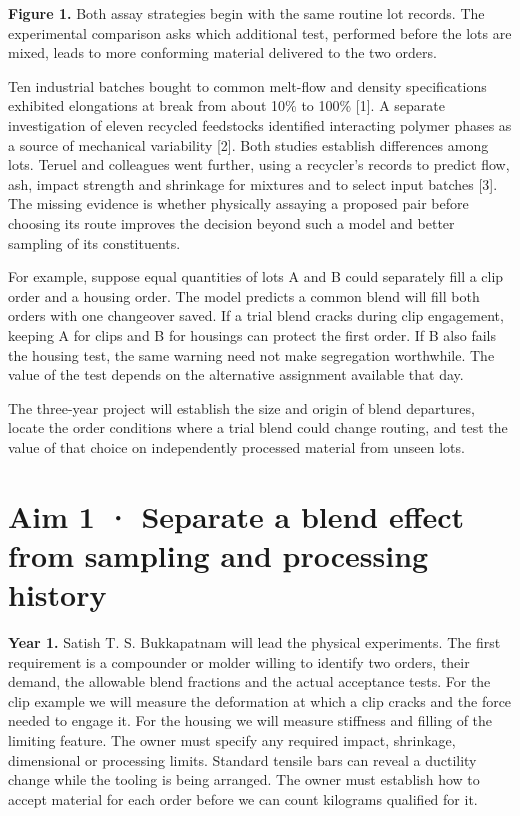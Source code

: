 \documentclass[11pt,letterpaper]{article}
\begin{document}
{\small\textbf{Figure 1.} Both assay strategies begin with the same routine lot records. The experimental comparison asks which additional test, performed before the lots are mixed, leads to more conforming material delivered to the two orders.}

Ten industrial batches bought to common melt-flow and density specifications exhibited elongations at break from about 10\% to 100\% [1]. A separate investigation of eleven recycled feedstocks identified interacting polymer phases as a source of mechanical variability [2]. Both studies establish differences among lots. Teruel and colleagues went further, using a recycler's records to predict flow, ash, impact strength and shrinkage for mixtures and to select input batches [3]. The missing evidence is whether physically assaying a proposed pair before choosing its route improves the decision beyond such a model and better sampling of its constituents.

For example, suppose equal quantities of lots A and B could separately fill a clip order and a housing order. The model predicts a common blend will fill both orders with one changeover saved. If a trial blend cracks during clip engagement, keeping A for clips and B for housings can protect the first order. If B also fails the housing test, the same warning need not make segregation worthwhile. The value of the test depends on the alternative assignment available that day.

The three-year project will establish the size and origin of blend departures, locate the order conditions where a trial blend could change routing, and test the value of that choice on independently processed material from unseen lots.

\newpage

\section*{Aim 1 · Separate a blend effect from sampling and processing history}

\textbf{Year 1.} Satish T. S. Bukkapatnam will lead the physical experiments. The first requirement is a compounder or molder willing to identify two orders, their demand, the allowable blend fractions and the actual acceptance tests. For the clip example we will measure the deformation at which a clip cracks and the force needed to engage it. For the housing we will measure stiffness and filling of the limiting feature. The owner must specify any required impact, shrinkage, dimensional or processing limits. Standard tensile bars can reveal a ductility change while the tooling is being arranged. The owner must establish how to accept material for each order before we can count kilograms qualified for it.
\end{document}
